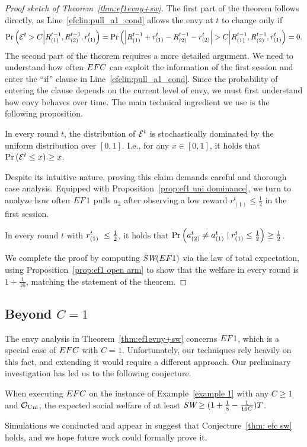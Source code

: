 \begin{proof}[Proof sketch of Theorem~\ref{thm:ef1evny+sw}]
The first part of the theorem follows directly, as Line~\ref{efclin:pull_a1_cond} allows the envy at $t$ to change only if
\[
\Pr\left( \mathcal{E}^t> C\middle| R^{t-1}_{(1)}, R^{t-1}_{(2)},r^t_{(1)} \right)=
\Pr\left( \left\lvert R^{t-1}_{(1)} + r^t_{(1)} - R^{t-1}_{(2)}-r^t_{(2)}\right\rvert > C\middle| R^{t-1}_{(1)}, R^{t-1}_{(2)},r^t_{(1)} \right)=0.
\]
The second part of the theorem requires a more detailed argument. We need to understand how often $EFC$ can exploit the information of the first session and enter the ``if'' clause in Line~\ref{efclin:pull_a1_cond}. Since the probability of entering the clause depends on the current level of envy, we must first understand how envy behaves over time. The main technical ingredient we use is the following proposition.
\begin{proposition}\label{prop:ef1 uni dominance}%
In every round $t$, the distribution of $\mathcal{E}^t$ is stochastically dominated by the uniform distribution over $[0,1]$. I.e., for any $x \in [0,1]$, it holds that $\Pr\left( \mathcal{E}^t \leq x \right) \geq x$.
\end{proposition}
Despite its intuitive nature, proving this claim demands careful and thorough case analysis. Equipped with Proposition~\ref{prop:ef1 uni dominance}, we turn to analyze how often $EF1$ pulls $a_2$ after observing a low reward $r^t_{(1)} \leq \frac{1}{2}$ in the first session.
\begin{proposition}\label{prop:ef1 open arm}
        In every round $t$ with $r_{(1)}^t\ \leq \frac{1}{2}$, it holds that $\Pr\left( a^t_{(2)} \neq a^t_{(1)} \mid r_{(1)}^t \leq \frac{1}{2} \right) \geq \frac{1}{2}$. 
\end{proposition}
We complete the proof by computing $\textit{SW}(EF1)$ via the law of total expectation, using Proposition~\ref{prop:ef1 open arm} to show that the welfare in every round is $1+\frac{1}{16}$, matching the statement of the theorem.
\end{proof}

\subsection{Beyond $C=1$}
The envy analysis in Theorem~\ref{thm:ef1evny+sw} concerns $EF1$, which is a special case of $EFC$ with $C=1$. Unfortunately, our techniques rely heavily on this fact, and extending it would require a different approach. Our preliminary investigation has led us to the following conjecture.
\begin{conjecture}\label{thm: efc sw}
When executing $EFC$ on the instance of Example~\ref{example 1} with any $C \geq 1$ and $\mathcal O_{\textnormal{Uni}}$, the expected social welfare of at least $\textit{SW} \geq (1+\frac{1}{8}-\frac{1}{16C})T$.
\end{conjecture}
Simulations we conducted and appear in  suggest that Conjecture~\ref{thm: efc sw} holds, and we hope future work could formally prove it.

